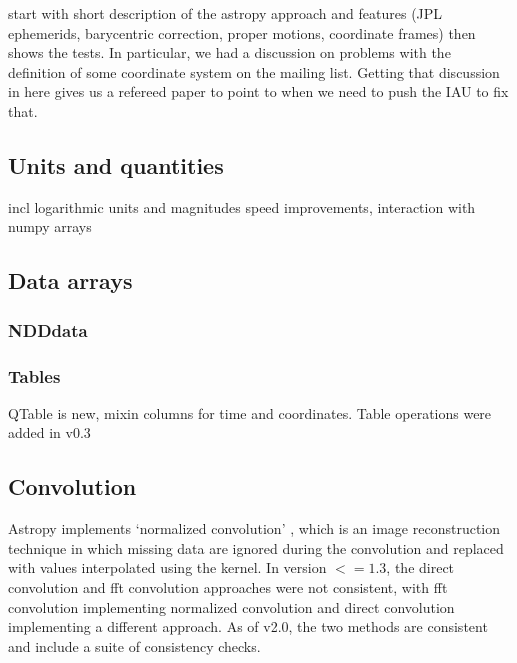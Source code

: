 \documentclass[modern]{aastex61}
\begin{document}
start with short description of the astropy approach and features (JPL ephemerids, barycentric correction, proper motions, coordinate frames) then shows the tests. In particular, we had a discussion on problems with the definition of some coordinate system on the mailing list. Getting that discussion in here gives us a refereed paper to point to when we need to push the IAU to fix that.

\subsection{Units and quantities}

incl logarithmic units and magnitudes
speed improvements,
interaction with numpy arrays

\subsection{Data arrays}

\subsubsection{NDDdata}

\subsubsection{Tables}
QTable is new, mixin columns for time and coordinates. Table operations were added in v0.3

\subsection{Convolution}
Astropy implements `normalized convolution' \citep[e.g.,][]{Knutsson1993}, which is an image reconstruction technique in which missing data are ignored during the convolution and replaced with values interpolated using the kernel.   In version $<=1.3$, the direct convolution and fft convolution approaches were not consistent, with fft convolution implementing normalized convolution and direct convolution implementing a different approach.  As of v2.0, the two methods are consistent and include a suite of consistency checks.
\end{document}
